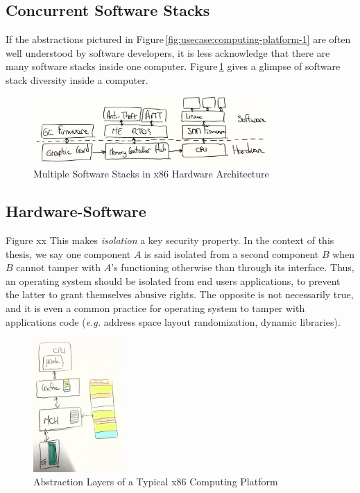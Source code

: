 \subsection{Concurrent Software Stacks}

If the abstractions pictured in Figure\,\ref{fig:usecase:computing-platform-1}
are often well understood by software developers, it is less acknowledge that
there are many software stacks inside one computer.
%
Figure\,\ref{fig:usecase:computing-platform-2} gives a glimpse of software stack
diversity inside a computer.

\begin{figure}
  \centering
  \includegraphics[width=0.8\textwidth]{Figures/intro-computing-platform.jpg}
  \caption{Multiple Software Stacks in x86 Hardware Architecture}
  \label{fig:usecase:computing-platform-2}
\end{figure}

\subsection{Hardware-Software}

Figure xx
%
This makes \emph{isolation} a key security property.
%
In the context of this thesis, we say one component $A$ is said isolated from a
second component $B$ when $B$ cannot tamper with $A$'s functioning otherwise
than through its interface.
%
Thus, an operating system should be isolated from end users applications, to
prevent the latter to grant themselves abusive rights.
%
The opposite is not necessarily true, and it is even a common practice for
operating system to tamper with applications code (\emph{e.g.} address space
layout randomization, dynamic libraries).

\begin{figure}
  \centering
  \includegraphics[width=0.3\textwidth]{Figures/computing-platform-3.jpg}
  \caption{Abstraction Layers of a Typical x86 Computing Platform}
  \label{fig:usecase:computing-platform-3}
\end{figure}

